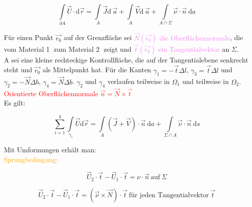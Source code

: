\documentclass[]{article}
\newcommand{\dd}{\ensuremath{\text{d}}}
\begin{document}
	\begin{boxedminipage}[blue]{\textwidth}
		$$\int\limits_{∂A}\vec{U}\cdot \dd \vec{r}=\int\limits_{A}\vec{J} \dd \ \vec{a}+\int\limits_A \vec{V} \dd \ \vec{a} + \int\limits_{A\cap \Sigma}\vec{\nu}\cdot \vec{n} \ \dd a$$
	\end{boxedminipage}
	
	Für einen Punkt $\vec{r_0}$ auf der Grenzfläche sei \textcolor{violet}{$\vec{N}(\vec{r_0})$ die Oberflächennormale}, die vom Material \textcircled{1} zum Material \textcircled{2} zeigt und \textcolor{violet}{$\vec{t}(\vec{r_0})$ ein Tangentialvektor} an $\Sigma$. 
	\\ A sei eine kleine rechteckige Kontrollfläche, die auf der Tangentialebene senkrecht steht und $\vec{r_0}$ als Mittelpunkt hat.  Für die Kanten $\gamma_1=-\vec{t}\Delta l$, $\gamma_3=\vec{t}\Delta l$ und $\gamma_2=-\vec{N}\Delta b$, $\gamma_4=\vec{N}\Delta b$. $\gamma_2$ und $\gamma_4$ verlaufen teilweise in $\Omega_1$ und teilweise in $\Omega_2$. 
	\\\textcolor{red}{Orientierte Oberflächennormale $\vec{n}=\vec{N}\times \vec{t}$}
	\\Es gilt:
	
	\begin{center}
		\begin{boxedminipage}[red]{9cm}
			\begin{displaymath}
				\sum\limits_{i=1}^{4} \int\limits_{\gamma_i} \vec{U}\dd \vec{r}=\int\limits_{A}(\vec{J}+\vec{V})\cdot \vec{n}\ \dd a+\int\limits_{\Sigma \cap A} \vec{\nu} \cdot \vec{n} \ \dd s
			\end{displaymath} 
		\end{boxedminipage}
	\end{center}
	
\newpage

 Mit Umformungen erhält man: 
	\\\textcolor{orange}{Sprungbedingung:}
	
	\begin{center}
		\begin{boxedminipage}[orange]{9cm}
			\begin{displaymath}
				\vec{U}_2\cdot \vec{t}-\vec{U}_1\cdot \vec{t}=\nu\cdot \vec{n} \ \text{auf} \ \Sigma
			\end{displaymath} 
		\end{boxedminipage}
	\end{center}
	
	\begin{center}
		\begin{boxedminipage}[orange]{9cm}
			\begin{displaymath}
				\vec{U}_2\cdot \vec{t}-\vec{U}_1\cdot \vec{t}= (\vec{\nu}\times \vec{N})\cdot \vec{t} \ \text{für jeden Tangentialvektor} \ \vec{t}
			\end{displaymath} 
		\end{boxedminipage}
	\end{center}
	
\end{document}
